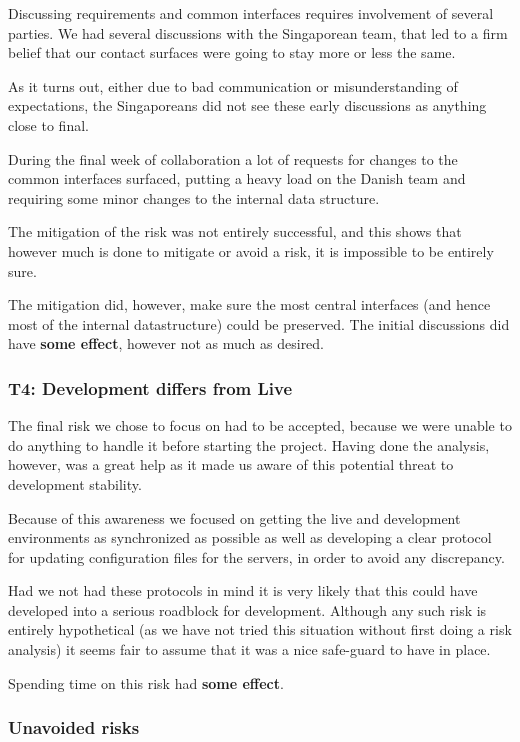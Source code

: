 Discussing requirements and common interfaces requires involvement of several parties. We had several
discussions with the Singaporean team, that led to a firm belief that our contact surfaces were going
to stay more or less the same.

As it turns out, either due to bad communication or misunderstanding of expectations, the Singaporeans
did not see these early discussions as anything close to final.

During the final week of collaboration a lot of requests for changes to the common interfaces surfaced,
putting a heavy load on the Danish team and requiring some minor changes to the internal data structure.

The mitigation of the risk was not entirely successful, and this shows that however much is done to mitigate
or avoid a risk, it is impossible to be entirely sure.

The mitigation did, however, make sure the most central interfaces (and hence most of the internal datastructure)
could be preserved. The initial discussions did have \textbf{some effect}, however not as much as desired.

\subsubsection{T4: Development differs from Live}

The final risk we chose to focus on had to be accepted, because we were unable to do
anything to handle it before starting the project. Having done the analysis, however, was a great help
as it made us aware of this potential threat to development stability.

Because of this awareness we focused on getting the live and development environments as synchronized as
possible as well as developing a clear protocol for updating configuration files for the servers, in
order to avoid any discrepancy.

Had we not had these protocols in mind it is very likely that this could have developed into a serious
roadblock for development. Although any such risk is entirely hypothetical (as we have not tried this
situation without first doing a risk analysis) it seems fair to assume that it was a nice safe-guard to
have in place.

Spending time on this risk had \textbf{some effect}.

\subsubsection{Unavoided risks}

